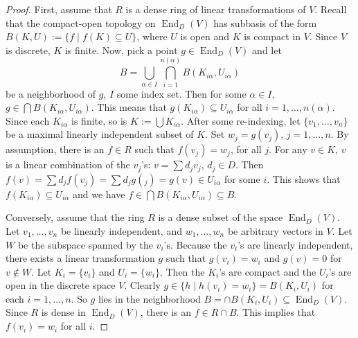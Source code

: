 \documentclass[12pt]{article}
\begin{document}
\begin{proof} First, assume that $R$ is a dense ring of linear transformations of $V$.  Recall that the compact-open topology on $\operatorname{End}_D(V)$ has subbasis of the form $B(K,U):=\lbrace f\mid f(K)\subseteq U\rbrace$, where $U$ is open and $K$ is compact in $V$.  Since $V$ is discrete, $K$ is finite.  Now, pick a point $g\in \operatorname{End}_D(V)$ and let $$B=\bigcup_{\alpha\in I}\bigcap_{i=1}^{n(\alpha)}B(K_{i\alpha},U_{i\alpha})$$ be a neighborhood of $g$, $I$ some index set.  Then for some $\alpha\in I$, $g\in \bigcap B(K_{i\alpha},U_{i\alpha})$.  This means that $g(K_{i\alpha})\subseteq U_{i\alpha}$ for all $i=1,\ldots,n(\alpha)$.  Since each $K_{i\alpha}$ is finite, so is $K:=\bigcup K_{i\alpha}$.  After some re-indexing, let $\lbrace v_1,\ldots, v_n\rbrace$ be a maximal linearly independent subset of $K$.  Set $w_j=g(v_j)$, $j=1,\ldots,n$.  By assumption, there is an $f\in R$ such that $f(v_j)=w_j$, for all $j$.  For any $v\in K$, $v$ is a linear combination of the $v_j$'s: $v=\sum d_jv_j$, $d_j\in D$.  Then $f(v)=\sum d_jf(v_j)=\sum d_jg(_j)=g(v)\in U_{i\alpha}$ for some $i$.  This shows that $f(K_{i\alpha})\subseteq U_{i\alpha}$ and we have $f\in \bigcap B(K_{i\alpha},U_{i\alpha})\subseteq B$.

Conversely, assume that the ring $R$ is a dense subset of the space $\operatorname{End}_D(V)$.  Let $v_1,\ldots,v_n$ be linearly independent, and $w_1,\ldots,w_n$ be arbitrary vectors in $V$.  Let $W$ be the subspace spanned by the $v_i$'s.  Because the $v_i$'s are linearly independent, there exists a linear transformation $g$ such that $g(v_i)=w_i$ and $g(v)=0$ for $v\notin W$.  Let $K_i=\lbrace v_i\rbrace$ and $U_i=\lbrace w_i\rbrace$.  Then the $K_i$'s are compact and the $U_i$'s are open in the discrete space $V$.  Clearly $g\in\lbrace h\mid h(v_i)=w_i\rbrace=B(K_i,U_i)$ for each $i=1,\ldots,n$.  So $g$ lies in the neighborhood $B=\cap B(K_i,U_i)\subseteq \operatorname{End}_D(V)$.  Since $R$ is dense in $\operatorname{End}_D(V)$, there is an $f\in R\cap B$.  This implies that $f(v_i)=w_i$ for all $i$.
\end{proof}
\end{document}
